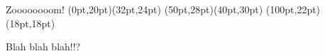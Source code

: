 \documentclass[17pt,dvipdfmx]{beamer}
\begin{document}
\begin{frame}{Zoooooooom!}
(0pt,20pt)(32pt,24pt)%
(50pt,28pt)(40pt,30pt)%
(100pt,22pt)(18pt,18pt)%
\strut\par
Blah blah blah!!?
\end{frame}
\end{document}
